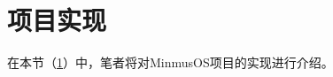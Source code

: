 \section{项目实现}\label{sec:ProjectImplementation}

在本节（\cref{sec:ProjectImplementation}）中，笔者将对MinmusOS项目的实现进行介绍。